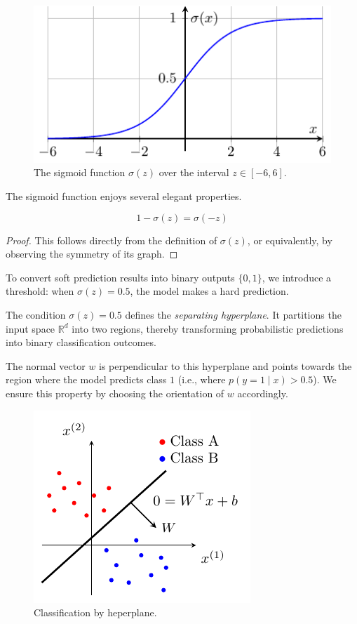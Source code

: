 \documentclass[../main]{subfiles}
\begin{document}
\begin{figure}[H]
  \centering
  \includegraphics{../../tikz/2/1.pdf}
  \caption{The sigmoid function $\sigma(z)$ over the interval $z \in [-6,6]$.}
\end{figure}

The sigmoid function enjoys several elegant properties.

\begin{theorem}
\[
1 - \sigma(z) = \sigma(-z)
\]
\end{theorem}

\begin{proof}
This follows directly from the definition of $\sigma(z)$, or equivalently, by observing the symmetry of its graph.
\end{proof}

To convert soft prediction results into binary outputs $\{0,1\}$, we introduce a threshold: when $\sigma(z) = 0.5$, the model makes a hard prediction.

\begin{definition}
The condition $\sigma(z) = 0.5$ defines the \emph{separating hyperplane}. It partitions the input space $\mathbb{R}^d$ into two regions, thereby transforming probabilistic predictions into binary classification outcomes.
\end{definition}
The normal vector $w$ is perpendicular to this hyperplane and points towards the region where the model predicts class $1$ 
(i.e., where $p(y=1 \mid x) > 0.5$). 
We ensure this property by choosing the orientation of $w$ accordingly.
\begin{figure}[H]
  \centering
  \includegraphics{../../tikz/2/2.pdf}
  \caption{Classification by heperplane.}
  \label{2-lr}
\end{figure}
\end{document}
